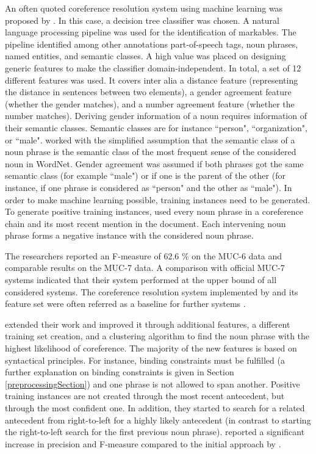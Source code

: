 An often quoted coreference resolution system using machine learning was proposed by \cite{soon2001machine}. In this case, a decision tree classifier was chosen. A natural language processing pipeline was used for the identification of markables. The pipeline identified among other annotations part-of-speech tags, noun phrases, named entities, and semantic classes. A high value was placed on designing generic features to make the classifier domain-independent. In total, a set of 12 different features was used. It covers inter alia a distance feature (representing the distance in sentences between two elements), a gender agreement feature (whether the gender matches), and a number agreement feature (whether the number matches). Deriving gender information of a noun requires information of their semantic classes. Semantic classes are for instance ``person", ``organization", or ``male". \cite{soon2001machine} worked with the simplified assumption that the semantic class of a noun phrase is the semantic class of the most frequent sense of the considered noun in WordNet. Gender agreement was assumed if both phrases got the same semantic class (for example ``male") or if one is the parent of the other (for instance, if one phrase is considered as ``person" and the other as ``male"). 
In order to make machine learning possible, training instances need to be generated.\\
To generate positive training instances, \cite{soon2001machine} used every noun phrase in a coreference chain and its most recent mention in the document. Each intervening noun phrase forms a negative instance with the considered noun phrase. 

The researchers reported an F-measure of 62.6 \% on the MUC-6 data and comparable results on the MUC-7 data. A comparison with official MUC-7 systems indicated that their system performed at the upper bound of all considered systems. The coreference resolution system implemented by \cite{soon2001machine} and its feature set were often referred as a baseline for further systems \citep{versley2008bart}.

\cite{ng2002improving} extended their work and improved it through additional features, a different training set creation, and a clustering algorithm to find the noun phrase with the highest likelihood of coreference. The majority of the new features is based on syntactical principles. For instance, binding constraints must be fulfilled (a further explanation on binding constraints is given in Section \ref{preprocessingSection}) and one phrase is not allowed to span another. Positive training instances are not created through the most recent antecedent, but through the most confident one. In addition, they started to search for a related antecedent from right-to-left for a highly likely antecedent (in contrast to starting the right-to-left search for the first previous noun phrase). \cite{ng2002improving} reported a significant increase in precision and F-measure compared to the initial approach by \cite{soon2001machine}.

